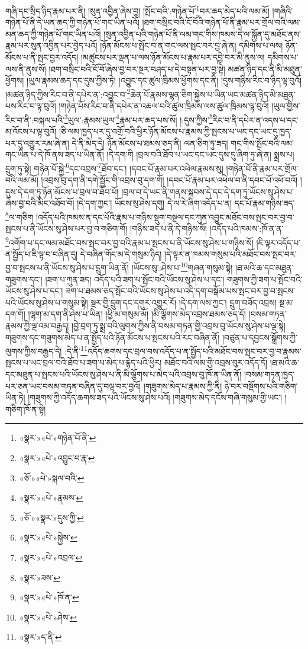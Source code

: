 གཞི་དང་སྲིད་ཉིད་རྣམ་པར་ནི། །སུན་འབྱིན་ཞེས་བྱ། །སྤོང་བའི་:གཉེན་པོ་\footnote{«སྣར་»«པེ་»གཉེན་པོ་ནི་}བར་ཆད་མེད་པའི་ལམ་མོ། །གཞིའི་གཉེན་པོ་ནི་དེ་ཡན་ཆད་ཀྱི་གཉེན་པོ་གང་ཡིན་པའོ། །ཐག་བསྲིང་བའི་ངོ་བོའི་གཉེན་པོ་ནི་རྣམ་པར་གྲོལ་བའི་ལམ་མན་ཆད་ཀྱི་གཉེན་པོ་གང་ཡིན་པའོ། །སུན་འབྱིན་པའི་གཉེན་པོ་ནི་ལམ་གང་གིས་ཁམས་དེ་ལ་སྐྱོན་དུ་མཐོང་ནས་རྣམ་པར་སུན་འབྱིན་པར་བྱེད་པའོ། །ཉོན་མོངས་པ་སྤོང་བ་ན་གང་ལས་སྤང་བར་བྱ་ཞེ་ན། དམིགས་པ་ལས། ཉོན་མོངས་པ་ནི་སྤང་བྱར་འདོད། །མཚུངས་པར་ལྡན་པ་ལས་ཉོན་མོངས་པ་རྣམ་པར་དབྱེ་བར་མི་ནུས་ལ། དམིགས་པ་ལས་ནི་ནུས་སོ། །ཐག་བསྲིང་བའི་ངོ་བོ་ཞེས་བྱ་བར་སྔར་བཤད་པ་དེ་བསྟན་པར་བྱ་སྟེ། མཚན་ཉིད་དང་ནི་མི་མཐུན་ཕྱོགས། །ཡུལ་རྣམས་ཆད་དང་དུས་ཀྱིས་ཏེ། །འབྱུང་དང་ཚུལ་ཁྲིམས་ཕྱོགས་དང་ནི། །དུས་གཉིས་རིང་བ་ཉིད་ལྟ་བུའོ། །མཚན་ཉིད་ཀྱིས་རིང་བ་ནི་དཔེར་ན་:འབྱུང་བ་\footnote{«སྣར་»«པེ་»འབྱུང་བ་རྣ་}ཆེན་པོ་རྣམས་ལྷན་ཅིག་སྐྱེས་པ་ཡིན་ཡང་མཚན་ཉིད་མི་མཐུན་པས་རིང་བ་ལྟ་བུའོ། །གཉེན་པོས་རིང་བ་ནི་དཔེར་ན་འཆལ་བའི་ཚུལ་ཁྲིམས་ལས་ཚུལ་ཁྲིམས་ལྟ་བུའོ། །ཡུལ་གྱིས་རིང་བ་ནི་:བསྐལ་པའི་\footnote{«ཅོ་»«པེ་»སྐལ་བའི་}ཡུལ་:རྣམས་ཡུལ་\footnote{«སྣར་»«པེ་»རྣམས་}རྣམ་པར་ཆད་པས་སོ། །:དུས་ཀྱིས་\footnote{«ཅོ་»«སྣར་»དུས་ཀྱི་}རིང་བ་ནི་དཔེར་ན་འདས་པ་དང་མ་འོངས་པ་ལྟ་བུའོ། །ཅི་ལམ་ཁྱད་པར་དུ་འགྲོ་བའི་ཕྱིར་ཉོན་མོངས་པ་རྣམས་ཀྱི་སྤངས་པ་ཡང་དང་ཡང་དུ་ཁྱད་པར་དུ་འགྱུར་རམ་ཞེ་ན། དེ་ནི་མེད་དེ། ཉོན་མོངས་པ་ཐམས་ཅད་ནི། ལན་ཅིག་ཏུ་ཟད། གང་གིས་སྤོང་བའི་ལམ་གང་ཡིན་པ་དེ་ཁོ་ནས་ཟད་པ་ཡིན་ནོ། །དེ་དག་གི །བྲལ་བའི་ཐོབ་པ་ཡང་དང་ཡང་དུས་དུ་ཞིག་ཏུ་ཞེ་ན། སྨྲས་པ། དྲུག་ཏུ་སྟེ། གཉེན་པོ་སྐྱེ་\footnote{«སྣར་»«པེ་»སྐྱེས་}དང་འབྲས་\footnote{«སྣར་»«པེ་»འབྲལ་}ཐོབ་དང་། །དབང་པོ་རྣམ་པར་འཕེལ་རྣམས་སུ། །གཉེན་པོ་ནི་རྣམ་པར་གྲོལ་བའི་ལམ་མོ། །འབྲས་བུ་དག་ནི་དགེ་སྦྱོང་གི་འབྲས་བུ་དག་གོ། །དབང་པོ་རྣམ་པར་འཕེལ་བ་ནི་དབང་པོ་འཕོ་བའོ། །དུས་དེ་དག་ཏུ་ཉོན་མོངས་པ་བྲལ་བ་ཐོབ་པོ། །བྲལ་བ་དེ་ཡང་ནི་གནས་སྐབས་དེ་དང་དེ་དག་ཏུ་ཡོངས་སུ་ཤེས་པ་ཞེས་བྱ་བའི་མིང་འཐོབ་བོ། །དེ་དག་ཀྱང་། ཡོངས་སུ་ཤེས་དགུ། དེ་ལ་རེ་ཞིག་འདོད་པ་ན། དང་པོ་རྣམ་གཉིས་ཟད་\footnote{«སྣར་»ཟས་}ལ་གཅིག །འདོད་པའི་ཁམས་ན་དང་པོའི་རྣམ་པ་གཉིས་སྡུག་བསྔལ་དང་ཀུན་འབྱུང་མཐོང་བས་སྤང་བར་བྱ་བ་སྤངས་པ་ནི་ཡོངས་སུ་ཤེས་པར་བྱ་བ་གཅིག་གོ། །གཉིས་ཟད་པ་ནི་དེ་གཉིས་སོ། །འདོད་པའི་ཁམས་:ཁོ་ན་ན་\footnote{«སྣར་»«པེ་»ཁོ་ན་}འགོག་པ་དང་ལམ་མཐོང་བས་སྤང་བར་བྱ་བའི་རྣམ་པ་སྤངས་པ་ནི་ཡོངས་སུ་ཤེས་པ་གཉིས་སོ། །ཇི་ལྟར་འདོད་པ་ན་སྤྱོད་པ་ཇི་ལྟ་བ་བཞིན་དུ། དེ་བཞིན་གོང་མ་དེ་གསུམ་ཉིད། །དེ་ལྟར་ན་ཁམས་གསུམ་པའི་མཐོང་བས་སྤང་བར་བྱ་བ་སྤངས་པ་ནི་ཡོངས་སུ་ཤེས་པ་དྲུག་ཡིན་ནོ། །ཡོངས་སུ་:ཤེས་པ་\footnote{«སྣར་»«པེ་»ཤེས་}གཞན་གསུམ་སྟེ། །ཐ་མའི་ཆ་དང་མཐུན་གཟུགས་དང་། །ཟག་པ་ཀུན་ཟད། འདོད་པའི་ཟག་པ་སྤོང་བའི་ཡོངས་སུ་ཤེས་པ་དང་། གཟུགས་ཀྱི་ཟག་པ་སྤོང་བའི་ཡོངས་སུ་ཤེས་པ་དང་། ཟག་པ་ཐམས་ཅད་སྤོང་བའི་ཡོངས་སུ་ཤེས་པ་འདི་དག་བསྒོམ་པས་སྤང་བར་བྱ་བ་སྤངས་པའི་ཡོངས་སུ་ཤེས་པ་གསུམ་སྟེ། སྔར་གྱི་དྲུག་དང་དགུར་འགྱུར་རོ། །དེ་དག་ལས་ཀྱང་། དྲུག་བཟོད་འབྲས། སྔ་མ་དག་གོ། །ལྷག་མ་དག་ནི་ཤེས་པ་ཡིན། །ཕྱི་མ་གསུམ་མོ། །མི་ལྕོགས་མེད་འབྲས་ཐམས་ཅད་དོ། །བསམ་གཏན་རྣམས་ཀྱི་ལྔ་འམ་བརྒྱད། །བྱེ་བྲག་ཏུ་སྨྲ་བའི་ལུགས་ཀྱིས་ནི་བསམ་གཏན་གྱི་འབྲས་བུ་ཡོངས་སུ་ཤེས་པ་ལྔ་སྟེ། གཟུགས་དང་གཟུགས་མེད་པ་ན་སྤྱོད་པའི་ཉོན་མོངས་པ་སྤངས་པའི་རང་བཞིན་ནོ། །བཙུན་པ་དབྱངས་སྒྲོགས་ཀྱི་ལུགས་ཀྱིས་བརྒྱད་དེ། :དེ་ནི་\footnote{«སྣར་»ད་ནི་}འདོད་ཆགས་དང་བྲལ་བས་འདོད་པ་ན་སྤྱོད་པའི་མཐོང་བས་སྤང་བར་བྱ་བ་རྣམས་སྤངས་པ་ཡང་བྲལ་བའི་ཐོབ་པ་ཟག་པ་མེད་པ་རྙེད་པའི་ཕྱིར། མཐོང་བའི་ལམ་གྱི་འབྲས་བུར་འདོད་དོ། །ཐ་མའི་ཆ་དང་མཐུན་པ་སྤངས་པའི་ཡོངས་སུ་ཤེས་པ་ནི་མི་ལྕོགས་པ་མེད་པའི་འབྲས་བུ་ཁོ་ན་ཡིན་ནོ། །བསམ་གཏན་ཁྱད་པར་ཅན་ཡང་བསམ་གཏན་བཞིན་དུ་བལྟ་བར་བྱའོ། །གཟུགས་མེད་པ་རྣམས་ཀྱི་ནི། ཉེ་བར་བསྡོགས་པའི་གཅིག་ཡིན་ཏེ། །གཟུགས་ཀྱི་འདོད་ཆགས་ཟད་པའི་ཡོངས་སུ་ཤེས་པའོ། །གཟུགས་མེད་དངོས་གཞི་གསུམ་གྱི་ཡང་། །གཅིག་ཁོ་ན་སྟེ། 
